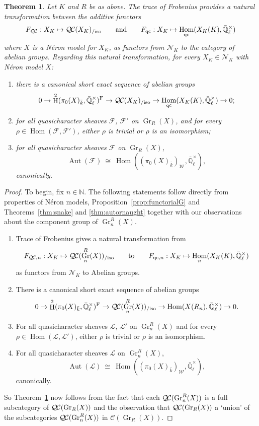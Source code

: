 \documentclass{amsart}
\theoremstyle{plain}
\newtheorem{theorem}{Theorem}[section]
\theoremstyle{definition}
\theoremstyle{remark}
\newcommand{\NN}{{\mathbb{N}}}
\newcommand{\EE}{\mathbb{\bar Q}_\ell}
\newcommand{\bFq}{\bar{k}}
\newcommand{\EEx}{\EE^\times}
\newcommand{\Weil}[1]{\mathcal{W}_{#1}}
\newcommand{\Frob}[1]{\operatorname{F}_{#1}}
\DeclareMathOperator{\Aut}{Aut}
\DeclareMathOperator{\Hom}{Hom}
\DeclareMathOperator{\Gr}{Gr}
\DeclareMathOperator{\Hh}{H}
\newcommand{\iso}{{\ \cong\ }}
\newcommand{\qcs}[1]{{\mathcal{#1}}}
\newcommand{\QC}{{\mathcal{Q\hskip-0.8pt C}}}
\newcommand{\QCiso}[1]{\QC(#1)_{/\text{iso}}}
\begin{document}
\begin{theorem}\label{thm:QCXK}
Let $K$ and $R$ be as above.
The trace of Frobenius provides a natural transformation between the additive functors
\[
F_{\QC}: X_K \mapsto \QCiso{X_K}
\qquad\text{and}\qquad
F_{\text{qc}}: X_K \mapsto \Hom_{\text{qc}}(X_K(K),\EEx)
\]
where $X$ is a Néron model for $X_K$, as functors from $\mathcal{N}_K$ to the category of abelian groups. 
Regarding this natural transformation, for every $X_K \in \mathcal{N}_K$ with Néron model $X$:
\begin{enumerate}
\item[(1)] there is a canonical short exact sequence of abelian groups 
\[
0 \to \Hh^2(\pi_0(X)_{\bFq},\EEx)^{\Frob{}} \to \QCiso{X_K} \to \Hom_\text{qc}(X_K(K),\EEx) \to 0;
\] 
\item[(2)] for all quasicharacter sheaves $\qcs{F}$, $\qcs{F}'$ on $\Gr_R(X)$, and for every $\rho \in \Hom(\qcs{F},\qcs{F}')$, either $\rho$ is trivial or $\rho$ is an isomorphism;
\item[(3)] for all quasicharacter sheaves $\qcs{F}$ on $\Gr_R(X)$,
\[
\Aut(\qcs{F}) \iso \Hom((\pi_0(X)_{\bFq})_{\Weil{}},\EEx),
\]
canonically.
\end{enumerate}
\end{theorem}

\begin{proof}
To begin, fix $n\in \NN$.
The following statements follow directly from properties of Néron models, Proposition~\ref{prop:functorialG} and Theorems~\ref{thm:snake} and \ref{thm:autornaught} together with our observations about the component group of $\Gr^R_n(X)$.
\begin{enumerate}
\item[(0)] Trace of Frobenius gives a natural transformation from
\[
F_{\QC,n}: X_K \mapsto \QCiso{\Gr^R_n(X)}
\qquad\text{to}\qquad
F_{\text{qc},n}: X_K \mapsto \Hom_n(X_K(K),\EEx)
\]
as functors from $\mathcal{N}_K$ to Abelian groups.
\item[(1)] There is a canonical short exact sequence of abelian groups 
\[
0 \to \Hh^2(\pi_0(X)_{\bFq},\EEx)^{\Frob{}} \to \QCiso{\Gr^R_n(X)} \to \Hom(X(R_n),\EEx) \to 0.
\] 
\item[(2)] For all quasicharacter sheaves $\qcs{L}$, $\qcs{L}'$ on $\Gr^R_n(X)$ and for every $\rho \in \Hom(\qcs{L},\qcs{L}')$, either $\rho$ is trivial or $\rho$ is an isomorphism.
\item[(3)] For all quasicharacter sheaves $\qcs{L}$ on $\Gr^R_n(X)$,
\[
\Aut(\qcs{L}) \iso \Hom((\pi_0(X)_{\bFq})_{\Weil{}},\EEx),
\]
canonically.
\end{enumerate}
So Theorem~\ref{thm:QCXK} now follows from the fact that each $\QC(\Gr^R_n(X))$ is a full subcategory of $\QC(\Gr_R(X))$ and the observation that $\QC(\Gr_R(X))$ a `union' of the subcategories $\QC(\Gr^R_n(X))$ in $\mathcal{C}(\Gr_R(X))$.
\end{proof}
\end{document}

